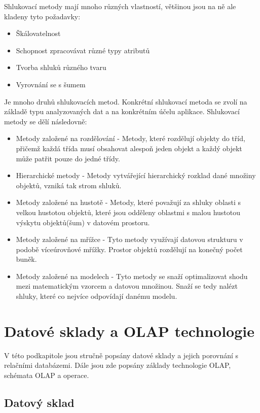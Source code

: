 Shlukovací metody mají mnoho různých vlastností, většinou jsou na ně ale kladeny tyto požadavky: \cite[Kapitola~10]{Kamber}

\begin{itemize}
  \item{Škálovatelnost}
  \item{Schopnost zpracovávat různé typy atributů}
  \item{Tvorba shluků různého tvaru}
  \item{Vyrovnání se s šumem}
\end{itemize}



Je mnoho druhů shlukovacích metod. Konkrétní shlukovací metoda se zvolí na základě typu analyzovaných dat a na konkrétním účelu aplikace. Shlukovací metody se dělí následovně: \cite[Kapitola~10]{Kamber}

\begin{itemize}
  \item{Metody založené na rozdělování - Metody, které rozdělují objekty do tříd, přičemž každá třída musí obsahovat alespoň jeden objekt a každý objekt může patřit pouze do jedné třídy.}
  \item{Hierarchické metody - Metody vytvářející hierarchický rozklad dané množiny objektů, vzniká tak strom shluků.}
  \item{Metody založené na hustotě - Metody, které považují za shluky oblasti s velkou hustotou objektů, které jsou odděleny oblastmi s malou hustotou výskytu objektů(šum) v datovém prostoru.}
  \item{Metody založené na mřížce - Tyto metody využívají datovou strukturu v podobě víceúrovňové mřížky. Prostor objektů rozdělují na konečný počet buněk.}
  \item{Metody založené na modelech - Tyto metody se snaží optimalizovat shodu mezi matematickým vzorcem a datovou množinou. Snaží se tedy nalézt shluky, které co nejvíce odpovídají danému modelu.}
\end{itemize}


\section{Datové sklady a OLAP technologie}

V této podkapitole jsou stručně popsány datové sklady a jejich porovnání s relačními databázemi. Dále jsou zde popsány základy technologie OLAP, schémata OLAP a operace.

\subsection{Datový sklad}

